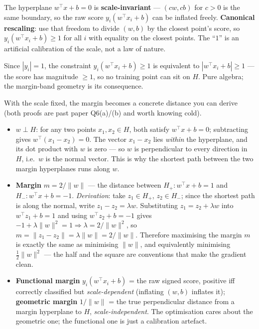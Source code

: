 \documentclass[11pt, a4paper]{article}
\newcommand{\kw}[1]{\textbf{#1}}
\begin{document}
The hyperplane $w^\top x+b=0$ is \kw{scale-invariant} — $(cw,cb)$ for $c>0$ is the same boundary, so
the raw score $y_i(w^\top x_i+b)$ can be inflated freely. \kw{Canonical rescaling}: use that freedom
to divide $(w,b)$ by the closest point's score, so $y_i(w^\top x_i+b)\ge1$ for all $i$ with equality
on the closest points. The ``$1$'' is an artificial calibration of the scale, not a law of nature.

\begin{notebox}
Since $|y_i|=1$, the constraint $y_i(w^\top x_i+b)\ge1$ is equivalent to $|w^\top x_i+b|\ge1$ — the
score has magnitude $\ge1$, so no training point can sit on $H$. Pure algebra; the margin-band
geometry is its consequence.
\end{notebox}

With the scale fixed, the margin becomes a concrete distance you can derive (both proofs are past
paper Q6(a)/(b) and worth knowing cold).

\begin{itemize}
  \item \kw{$w\perp H$}: for any two points $x_1,x_2\in H$, both satisfy $w^\top x+b=0$; subtracting
  gives $w^\top(x_1-x_2)=0$. The vector $x_1-x_2$ lies \emph{within} the hyperplane, and its dot
  product with $w$ is zero — so $w$ is perpendicular to every direction in $H$, i.e.\ $w$ is the
  normal vector. This is why the shortest path between the two margin hyperplanes runs along $w$.
  \item \kw{Margin} $m=2/\|w\|$ — the distance between $H_+:w^\top x+b=1$ and $H_-:w^\top x+b=-1$.
  \emph{Derivation}: take $z_1\in H_+$, $z_2\in H_-$; since the shortest path is along the normal,
  write $z_1-z_2=\lambda w$. Substituting $z_1=z_2+\lambda w$ into $w^\top z_1+b=1$ and using
  $w^\top z_2+b=-1$ gives $-1+\lambda\|w\|^2=1\Rightarrow\lambda=2/\|w\|^2$, so
  $m=\|z_1-z_2\|=\lambda\|w\|=2/\|w\|$. Therefore maximising the margin $m$ is exactly the same as
  minimising $\|w\|$, and equivalently minimising $\tfrac12\|w\|^2$ — the half and the square are
  conventions that make the gradient clean.
  \item \kw{Functional margin} $y_i(w^\top x_i+b)$ = the raw signed score, positive iff correctly
  classified but \emph{scale-dependent} (inflating $(w,b)$ inflates it); \kw{geometric margin}
  $1/\|w\|$ = the true perpendicular distance from a margin hyperplane to $H$, \emph{scale-independent}.
  The optimisation cares about the geometric one; the functional one is just a calibration artefact.
\end{itemize}
\end{document}

